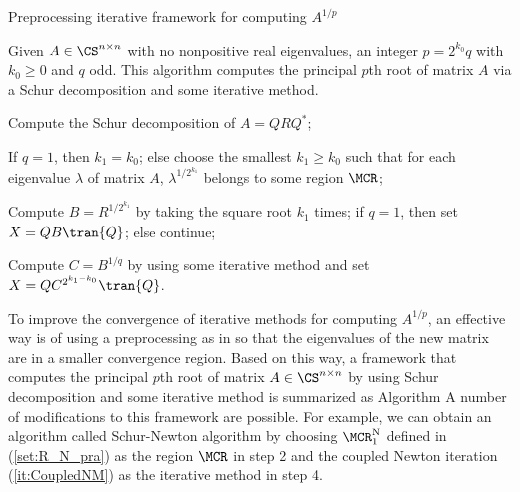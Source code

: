 \begin{algorithm}
\caption{Preprocessing iterative
framework for computing $A^{1/p}$} \label{al:SIM} Given $A \in
\CS^{n \times n}$ with no nonpositive real eigenvalues, an integer
$p = 2^{k_0}q$ with $k_0 \geq 0$ and $q$ odd. This algorithm
computes the principal $p$th root of matrix $A$ via a Schur
decomposition and some iterative method.
\begin{list}{.}{
\setlength{\rightmargin}{0em}\setlength{\leftmargin}{1.2em}}
\item
Compute the Schur decomposition of $A = QRQ^*$;
\item
If $q = 1$, then $k_1 = k_0$; else choose the smallest $k_1 \geq
k_0$ such that for each eigenvalue $\lambda$ of matrix $A$,
$\lambda^{1/2^{k_1}}$ belongs to some region $\MCR$;
\item
Compute $B = R^{1/2^{k_1}}$ by taking the square root $k_1$ times;
if $q = 1$, then set $X = QB\tran{Q}$; else continue;
\item
Compute $C = B^{1/q}$ by using some iterative method and set $X = Q
C^{2^{k_1 - k_0}} \tran{Q}$.
\end{list}
\end{algorithm}

To improve the convergence of iterative methods for computing
$A^{1/p}$, an effective way is of using a preprocessing as in
\cite{GuoHigham2006} so that the eigenvalues of the new matrix are
in a smaller convergence region. Based on this way, a framework that
computes the principal $p$th root of matrix $A \in \CS^{n \times n}$
by using Schur decomposition and some iterative method is summarized
as Algorithm
A number of modifications to this
framework are possible. For example, we can obtain an algorithm
called Schur-Newton algorithm by choosing $\MCR_1^{\text{N}}$
defined in (\ref{set:R_N_pra}) as the region $\MCR$ in step 2 and
the coupled Newton iteration (\ref{it:CoupledNM}) as the iterative
method in step 4.



